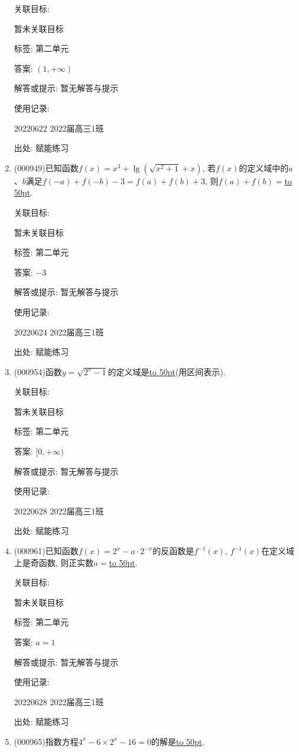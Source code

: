 \documentclass[10pt,a4paper]{article}
\newcommand{\blank}[1]{\underline{\hbox to #1pt{}}}
\begin{document}
\begin{enumerate}[1.]
关联目标:

暂未关联目标



标签: 第二单元

答案: $(1,+\infty)$

解答或提示: 暂无解答与提示

使用记录:

20220622	2022届高三1班	


出处: 赋能练习
\item { (000949)}已知函数$f(x)={x^3}+\lg (\sqrt{x^2+1}+x)$, 若$f(x)$的定义域中的$a$、$b$满足$f(-a)+f(-b)-3=f(a)+f(b)+3$, 则$f(a)+f(b)=$\blank{50}.


关联目标:

暂未关联目标



标签: 第二单元

答案: $-3$

解答或提示: 暂无解答与提示

使用记录:

20220624	2022届高三1班	


出处: 赋能练习
\item { (000954)}函数$y=\sqrt{2^x-1}$的定义域是\blank{50}(用区间表示).


关联目标:

暂未关联目标



标签: 第二单元

答案: $[0,+\infty)$

解答或提示: 暂无解答与提示

使用记录:

20220628	2022届高三1班	


出处: 赋能练习
\item { (000961)}已知函数$f(x)=2^x-a\cdot 2^{-x}$的反函数是$f^{-1}(x)$, $f^{-1}(x)$在定义域上是奇函数, 则正实数$a=$\blank{50}.


关联目标:

暂未关联目标



标签: 第二单元

答案: $a=1$

解答或提示: 暂无解答与提示

使用记录:

20220628	2022届高三1班	


出处: 赋能练习
\item { (000965)}指数方程$4^x-6 \times 2^x-16=0$的解是\blank{50}.



\end{enumerate}
\end{document}

